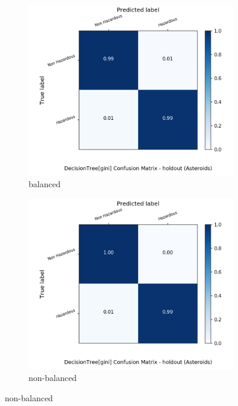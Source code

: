 \begin{figure}[H]
	\centering
	\begin{subfigure}{.5\textwidth}
		\centering
		\includegraphics[width=1.1\textwidth]{Plots/asteroids/asteroids_DecisionTree_gini_balance_True_holdout.png}
		\caption{balanced}
	\end{subfigure}%
	\begin{subfigure}{.5\textwidth}
		\centering
		\includegraphics[width=1.1\textwidth]{Plots/asteroids/asteroids_DecisionTree_gini_balance_False_holdout.png}
		\caption{non-balanced}
	\end{subfigure}
\end{figure}

